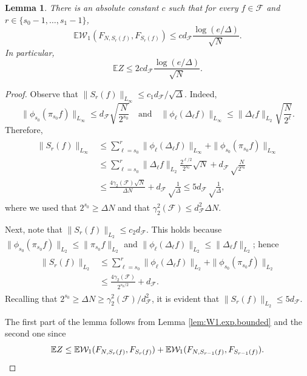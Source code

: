 \documentclass[11pt]{amsart}
\newcommand{\W}{\mathcal{W}}
\newtheorem{lemma}[theorem]{Lemma}
\theoremstyle{definition}
\newcommand{\E}{\mathbb{E}}
\numberwithin{equation}{section}
\begin{document}
\begin{lemma}
\label{lem:W1.Ss.Exp}
	There is an absolute constant $c$ such that for every $f\in\mathcal{F}$ and $r\in\{s_{0}-1,\dots, s_{1}-1\}$,
\[  \E \W_{1}(F_{N,S_{r}(f) }, F_{ S_{r}(f) } )  
\leq  cd_{\mathcal{F}}  \frac{\log(e/\Delta) }{\sqrt N}.\]
In particular,  
\[\E Z \leq  2c d_{\mathcal{F}} \frac{\log(e/\Delta) }{\sqrt N}.\]	
\end{lemma}
\begin{proof}
Observe that  $\| S_{r}(f) \|_{L_{\infty}} \leq  c_{1}  d_{\mathcal{F}} /\sqrt \Delta$.
Indeed, 
\[\|\phi_{s_0}(\pi_{s_{0}}f)\|_{L_{\infty}}  \leq  d_{\mathcal{F}} \sqrt{ \frac{N}{2^{s_{0}}}}\quad\text{and}\quad
\|\phi_{\ell}(\Delta_{\ell}f)\|_{L_{\infty}} \leq  \|\Delta_{\ell}f\|_{L_{2}} \sqrt{\frac{N}{2^{\ell}}} .
\]
Therefore,
\begin{align*}
\begin{split}
\|S_{r}(f) \|_{L_{\infty}} 
&\leq \sum_{\ell=s_{0}}^{r} \|\phi_{\ell}(\Delta_{\ell}f) \|_{L_{\infty}}  +  \|\phi_{s_0}(\pi_{s_{0}}f)\|_{L_{\infty}} \\
&\leq  \sum_{\ell=s_{0}}^{r}  \|\Delta_{\ell} f\|_{L_{2}}\frac{ 2^{\ell/2}}{2^{s_{0}}} \sqrt{N} + d_{\mathcal{F}}\sqrt\frac{N}{2^{s_{0}}} \\ 
&\leq  \frac{4\gamma_{2}(\mathcal{F}) \sqrt N}{ \Delta N} + d_{\mathcal{F}}\sqrt\frac{1}{\Delta } 
\leq 5d_{\mathcal{F}} \sqrt\frac{1}{\Delta } ,
\end{split}
\end{align*}
where we used that $2^{s_{0}}\geq \Delta N$
and that  $ \gamma_{2}^{2}(\mathcal{F}) \leq d_{\mathcal{F}}^{2} \Delta N $. 

Next, note that $\|S_{r}(f) \|_{L_{2}}\leq c_2d_{\mathcal{F}} $.
This holds because  $\| \phi_{s_0}(\pi_{s_{0}}f)\|_{L_{2}}  \leq \| \pi_{s_{0}}f\|_{L_{2}}$ and  $\|\phi_{\ell}(\Delta_{\ell}f) \|_{L_{2}}\leq  \|\Delta_{\ell}f\|_{L_{2}}$; hence 
\begin{align*}
\begin{split}
\|S_{r}(f) \|_{L_{2}}
&\leq \sum_{\ell=s_{0}}^{r} \|\phi_{\ell}(\Delta_{\ell}f) \|_{L_{2}}+ \| \phi_{s_0}(\pi_{s_{0}}f)\|_{L_{2}} \\
&\leq   \frac{4\gamma_{2}(\mathcal{F}) }{ 2^{s_{0}/2}} + d_{\mathcal{F}}.
\end{split}
\end{align*}
Recalling that $2^{s_{0}}\geq\Delta N \geq \gamma_{2}^{2}(\mathcal{F})/d_{\mathcal{F}}^{2}$, it is evident that $\|S_{r}(f) \|_{L_{2}}\leq 5d_{\mathcal{F}}$.

The first part of the lemma follows from Lemma \ref{lem:W1.exp.bounded} and the second one since
\[\E Z \leq \E \W_{1}(F_{N,S_{r}(f) }, F_{ S_{r}(f) } )  + \E \W_{1}(F_{N,S_{r-1}(f) }, F_{ S_{r-1}(f) } ).\qedhere\]
\end{proof}
\end{document}
